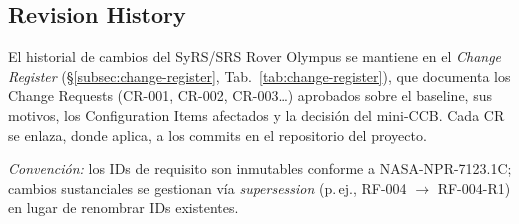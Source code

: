 \subsection{Revision History}

El historial de cambios del SyRS/SRS Rover Olympus se mantiene en el \emph{Change Register} (\S\ref{subsec:change-register}, Tab.~\ref{tab:change-register}), que documenta los Change Requests (CR-001, CR-002, CR-003\dots) aprobados sobre el baseline, sus motivos, los Configuration Items afectados y la decisión del mini-CCB. Cada CR se enlaza, donde aplica, a los commits en el repositorio del proyecto.

\emph{Convención:} los IDs de requisito son inmutables conforme a NASA-NPR-7123.1C; cambios sustanciales se gestionan vía \emph{supersession} (p.\,ej., RF-004 $\rightarrow$ RF-004-R1) en lugar de renombrar IDs existentes.

